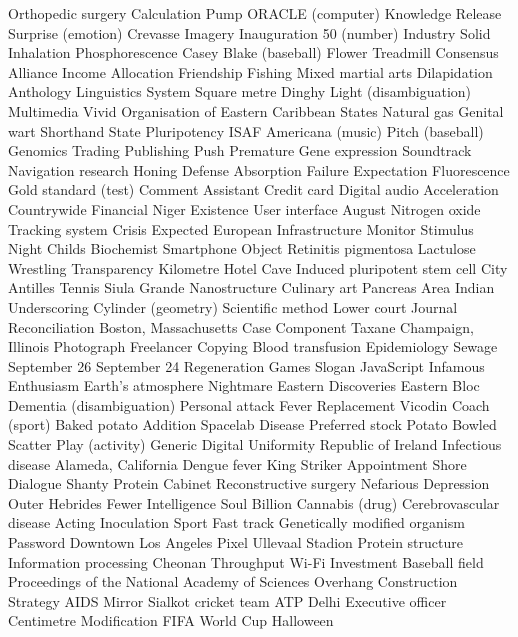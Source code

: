 Orthopedic surgery  Calculation  Pump  
ORACLE (computer)  Knowledge  Release  
Surprise (emotion)  Crevasse  Imagery  
Inauguration  50 (number)  Industry  
Solid  Inhalation  Phosphorescence  
Casey Blake (baseball)  Flower  Treadmill  
Consensus  Alliance  Income  
Allocation  Friendship  Fishing  
Mixed martial arts  Dilapidation  Anthology  
Linguistics  System  Square metre  
Dinghy  Light (disambiguation)  Multimedia  
Vivid  Organisation of Eastern Caribbean States  Natural gas  
Genital wart  Shorthand  State  
Pluripotency  ISAF  Americana (music)  
Pitch (baseball)  Genomics  Trading  
Publishing  Push  Premature  
Gene expression  Soundtrack  Navigation research  
Honing  Defense  Absorption  
Failure  Expectation  Fluorescence  
Gold standard (test)  Comment  Assistant  
Credit card  Digital audio  Acceleration  
Countrywide Financial  Niger  Existence  
User interface  August  Nitrogen oxide  
Tracking system  Crisis  Expected  
European  Infrastructure  Monitor  
Stimulus  Night  Childs  
Biochemist  Smartphone  Object  
Retinitis pigmentosa  Lactulose  Wrestling  
Transparency  Kilometre  Hotel  
Cave  Induced pluripotent stem cell  City  
Antilles  Tennis  Siula Grande  
Nanostructure  Culinary art  Pancreas  
Area  Indian  Underscoring  
Cylinder (geometry)  Scientific method  Lower court  
Journal  Reconciliation  Boston, Massachusetts  
Case  Component  Taxane  
Champaign, Illinois  Photograph  Freelancer  
Copying  Blood transfusion  Epidemiology  
Sewage  September 26  September 24  
Regeneration  Games  Slogan  
JavaScript  Infamous  Enthusiasm  
Earth's atmosphere  Nightmare  Eastern  
Discoveries  Eastern Bloc  Dementia (disambiguation)  
Personal attack  Fever  Replacement  
Vicodin  Coach (sport)  Baked potato  
Addition  Spacelab  Disease  
Preferred stock  Potato  Bowled  
Scatter  Play (activity)  Generic  
Digital  Uniformity  Republic of Ireland  
Infectious disease  Alameda, California  Dengue fever  
King  Striker  Appointment  
Shore  Dialogue  Shanty  
Protein  Cabinet  Reconstructive surgery  
Nefarious  Depression  Outer Hebrides  
Fewer  Intelligence  Soul  
Billion  Cannabis (drug)  Cerebrovascular disease  
Acting  Inoculation  Sport  
Fast track  Genetically modified organism  Password  
Downtown Los Angeles  Pixel  Ullevaal Stadion  
Protein structure  Information processing  Cheonan  
Throughput  Wi-Fi  Investment  
Baseball field  Proceedings of the National Academy of Sciences  Overhang  
Construction  Strategy  AIDS  
Mirror  Sialkot cricket team  ATP  
Delhi  Executive officer  Centimetre  
Modification  FIFA World Cup  Halloween  
